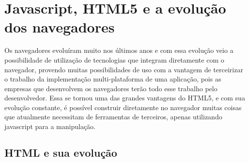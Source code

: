 \section{Javascript, HTML5 e a evolução dos navegadores}


Os navegadores evoluíram muito nos últimos anos e com essa evolução
veio a possibilidade de utilização de tecnologias que integram
diretamente com o navegador, provendo muitas possibilidades de uso com
a vantagem de terceirizar o trabalho da implementação multi-plataforma
de uma aplicação, pois as empresas que desenvolvem os navegadores
terão todo esse trabalho pelo desenvolvedor. Essa se tornou uma das
grandes vantagens do HTML5, e com sua evolução constante, é possível
construir diretamente no navegador muitas coisas que atualmente necessitam
de ferramentas de terceiros, apenas utilizando javascript para a
manipulação.

\subsection{HTML e sua evolução}

